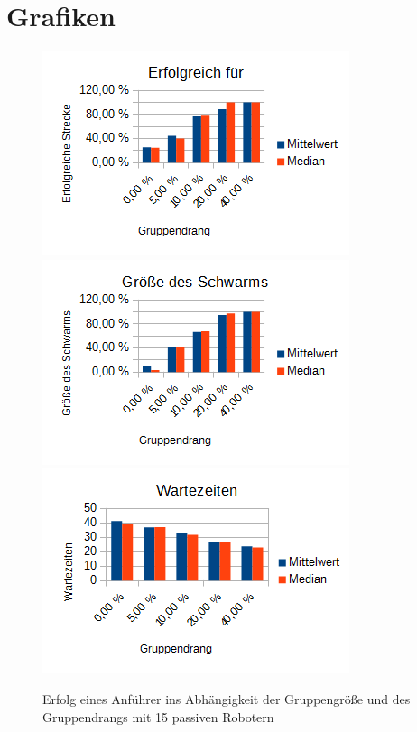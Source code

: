 \chapter{Grafiken}

\begin{figure}[h]
	\includegraphics[width=\sectionLeaderPictureWidth , keepaspectratio]{graphics/Statistics/Leader/FlockSize/15_1.png}
	\includegraphics[width=\sectionLeaderPictureWidth , keepaspectratio]{graphics/Statistics/Leader/FlockSize/15_2.png}
	\includegraphics[width=\sectionLeaderPictureWidth , keepaspectratio]{graphics/Statistics/Leader/FlockSize/15_3.png}
	\caption{Erfolg eines Anführer ins Abhängigkeit der Gruppengröße und des Gruppendrangs mit 15 passiven Robotern}
	\label{pic:LeaderSize15}
\end{figure}

